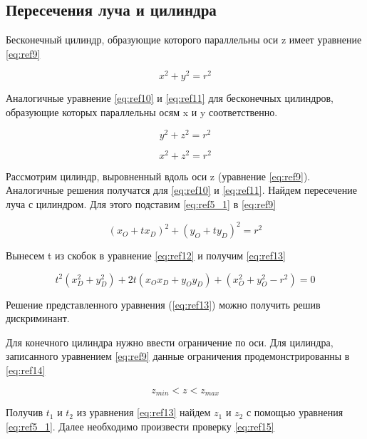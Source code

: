 \subsection {Пересечения луча и цилиндра}

Бесконечный цилиндр, образующие которого параллельны оси z имеет уравнение \ref{eq:ref9}

\begin{equation}
	x^2 + y^2 = r^2
	\label{eq:ref9}
\end{equation}

Аналогичные уравнение \ref{eq:ref10} и \ref{eq:ref11} для
бесконечных цилиндров, образующие которых параллельны осям x и y соответственно.

\begin{equation}
	y^2 + z^2 = r^2
	\label{eq:ref10}
\end{equation}

\begin{equation}
	x^2 + z^2 = r^2
	\label{eq:ref11}
\end{equation}

Рассмотрим цилиндр, выровненный вдоль оси z (уравнение \ref{eq:ref9}).
Аналогичные решения получатся для \ref{eq:ref10} и \ref{eq:ref11}.
Найдем пересечение луча с цилиндром.
Для этого подставим \ref{eq:ref5_1} в \ref{eq:ref9}

\begin{equation}
	(x_O + t x_D)^2 + (y_O + t y_D)^2 = r^2
	\label{eq:ref12}
\end{equation}

Вынесем t из скобок в уравнение \ref{eq:ref12} и получим \ref{eq:ref13}

\begin{equation}
	t^2(x_D^2+y_D^2) + 2t(x_Ox_D + y_Oy_D) + (x_O^2 + y_O^2 - r^2) = 0
	\label{eq:ref13}
\end{equation}

Решение представленного уравнения (\ref{eq:ref13}) можно получить решив дискриминант.

Для конечного цилиндра нужно ввести ограничение по оси.
Для цилиндра, записанного уравнением \ref{eq:ref9} данные ограничения
продемонстрированны в \ref{eq:ref14}

\begin{equation}
	z_{min} < z < z_{max}
	\label{eq:ref14}
\end{equation}

Получив $t_1$ и $t_2$ из уравнения \ref{eq:ref13}
найдем $z_1$ и $z_2$ с помощью уравнения \ref{eq:ref5_1}.
Далее необходимо произвести проверку \ref{eq:ref15}

